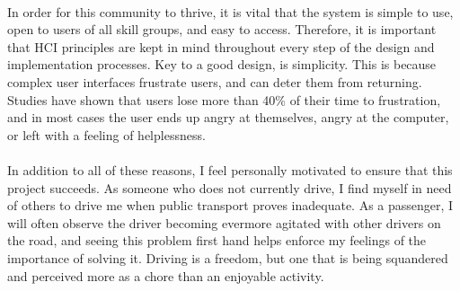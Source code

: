 \ \\
In order for this community to thrive, it is vital that the system is simple to use, open to users of all skill groups, and easy to access. Therefore, it is important that HCI principles are kept in mind throughout every step of the design and implementation processes. Key to a good design, is simplicity. This is because complex user interfaces frustrate users, and can deter them from returning. Studies have shown that users lose more than 40\% of their time to frustration, and in most cases the user ends up angry at themselves, angry at the computer, or left with a feeling of helplessness\cite{lazar2006workplace}.\ \\
\ \\
In addition to all of these reasons, I feel personally motivated to ensure that this project succeeds. As someone who does not currently drive, I find myself in need of others to drive me when public transport proves inadequate. As a passenger, I will often observe the driver becoming evermore agitated with other drivers on the road, and seeing this problem first hand helps enforce my feelings of the importance of solving it. Driving is a freedom, but one that is being squandered and perceived more as a chore than an enjoyable activity.